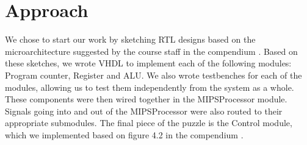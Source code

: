 \section{Approach}

We chose to start our work by sketching RTL designs based on the microarchitecture suggested by the course staff in the compendium \cite[p. 45]{compendium}.
Based on these sketches, we wrote VHDL to implement each of the following modules: Program counter, Register and ALU.
We also wrote testbenches for each of the modules, allowing us to test them independently from the system as a whole.
These components were then wired together in the MIPSProcessor module.
Signals going into and out of the MIPSProcessor were also routed to their appropriate submodules.
The final piece of the puzzle is the Control module, which we implemented based on figure 4.2 in the compendium \cite[p. 46]{compendium}.
